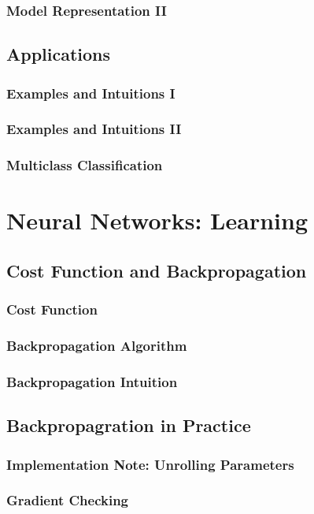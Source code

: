 \documentclass{article}
\begin{document}
\subsubsection{Model Representation II}
\subsection{Applications}
\subsubsection{Examples and Intuitions I}
\subsubsection{Examples and Intuitions II}
\subsubsection{Multiclass Classification}

\section{Neural Networks: Learning}
\subsection{Cost Function and Backpropagation}
\subsubsection{Cost Function}
\subsubsection{Backpropagation Algorithm}
\subsubsection{Backpropagation Intuition}
\subsection{Backpropagration in Practice}
\subsubsection{Implementation Note: Unrolling Parameters}
\subsubsection{Gradient Checking}
\end{document}
